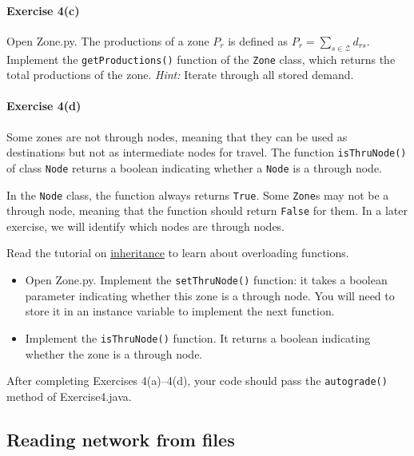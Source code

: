\documentclass[11pt]{article}
\newcommand{\Z}{\mathcal{Z}}
\begin{document}
\paragraph*{Exercise 4(c)} Open Zone.py. The productions of a zone $P_r$ is defined as $P_r=\sum\limits_{s\in\Z}d_{rs}$. Implement the \texttt{getProductions()} function of the \texttt{Zone} class, which returns the total productions of the zone. \textit{Hint:} Iterate through all stored demand.


\paragraph*{Exercise 4(d)} Some zones are not through nodes, meaning that they can be used as destinations but not as intermediate nodes for travel. The function \texttt{isThruNode()} of class \texttt{Node} returns a boolean indicating whether a \texttt{Node} is a through node. 

In the \texttt{Node} class, the function always returns \texttt{True}. Some \texttt{Zone}s may not be a through node, meaning that the function should return \texttt{False} for them. In a later exercise, we will identify which nodes are through nodes.

Read the tutorial on \href{https://www.w3schools.com/python/python_inheritance.asp}{inheritance} to learn about overloading functions. 
\begin{itemize}
	\item Open Zone.py. Implement the \texttt{setThruNode()} function: it takes a boolean parameter indicating whether this zone is a through node. You will need to store it in an instance variable to implement the next function.
	\item Implement the \texttt{isThruNode()} function. It returns a boolean indicating whether the zone is a through node.
\end{itemize}



 \vspace{\baselineskip}

\noindent
After completing Exercises 4(a)--4(d), your code should pass the \texttt{autograde()} method of Exercise4.java. 





\subsection{Reading network from files}
\label{sec33}
\end{document}
